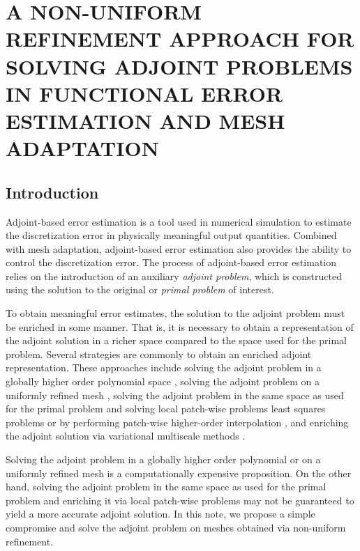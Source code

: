 \chapter{A NON-UNIFORM REFINEMENT APPROACH
FOR SOLVING ADJOINT PROBLEMS IN FUNCTIONAL
ERROR ESTIMATION AND MESH ADAPTATION}
\label{chap:refine}

\section{Introduction}

Adjoint-based error estimation
\cite{becker2001optimal, giles2003adjoint,
pierce2004adjoint, venditti2000adjoint,
venditti2002adjoint,
venditti2003adjoint,
prudhomme1999goal,
prudhomme2003practical,
fidkowski2011review,
connors2013method}
is a tool used in numerical simulation
to estimate the discretization error
in physically meaningful output quantities.
Combined with mesh adaptation, adjoint-based error
estimation also provides the ability to control the discretization
error. The process of adjoint-based error estimation
relies on the introduction of an auxiliary
\emph{adjoint problem}, which is constructed using
the solution to the original or \emph{primal problem}
of interest.

To obtain meaningful error estimates,
the solution to the adjoint problem must be
enriched in some manner. That is, it is
necessary to obtain a representation of the
adjoint solution in a richer space compared
to the space used for the primal problem.
Several strategies are commonly
to obtain an enriched adjoint representation.
These approaches include
solving the adjoint problem in a globally higher
order polynomial space
\cite{fidkowski2011output},
solving the adjoint problem on a uniformly
refined mesh \cite{burstedde2009parallel},
solving the adjoint problem in the same space
as used for the primal problem
and solving local patch-wise problems least
squares problems \cite{nemec2007adjoint} or
by performing patch-wise higher-order interpolation
\cite{becker2001optimal},
and enriching the adjoint solution via
variational multiscale methods
\cite{granzow2017output}.

Solving the adjoint problem in a globally higher
order polynomial or on a uniformly refined mesh
is a computationally expensive proposition. On the
other hand, solving the adjoint problem in the same
space as used for the primal problem and enriching
it via local patch-wise problems may not be guaranteed
to yield a more accurate adjoint solution. In this
note, we propose a simple compromise and solve the
adjoint problem on meshes obtained via non-uniform
refinement.

